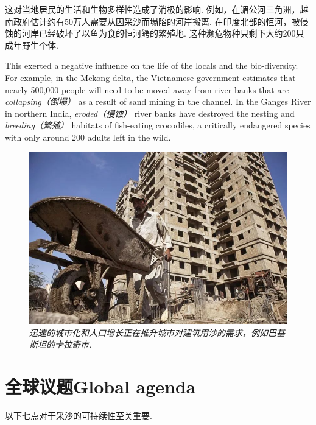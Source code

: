 \begin{multicols}{2}

这对当地居民的生活和生物多样性造成了消极的影响. 例如，在湄公河三角洲，越南政府估计约有50万人需要从因采沙而塌陷的河岸搬离. 在印度北部的恒河，被侵蚀的河岸已经破坏了以鱼为食的恒河鳄的繁殖地. 这种濒危物种只剩下大约200只成年野生个体. 

This exerted a negative influence on the life of the locals and the bio-diversity. For example, in the Mekong delta, the Vietnamese government estimates that nearly 500,000 people will need to be moved away from river banks that are  \emph{collapsing（倒塌）} as a result of sand mining in the channel. In the Ganges River in northern India,  \emph{eroded（侵蚀）} river banks have destroyed the nesting and  \emph{breeding（繁殖）} habitats of fish-eating crocodiles, a critically endangered species with only around 200 adults left in the wild.


\begin{figure}[H]
\centering
\includegraphics[width=\linewidth]{IMG/201911/image9.jpeg}
\caption{\textit{迅速的城市化和人口增长正在推升城市对建筑用沙的需求，例如巴基斯坦的卡拉奇市. }}
\end{figure}



\section*{全球议题\quad Global agenda}

以下七点对于采沙的可持续性至关重要. 


\end{multicols}
